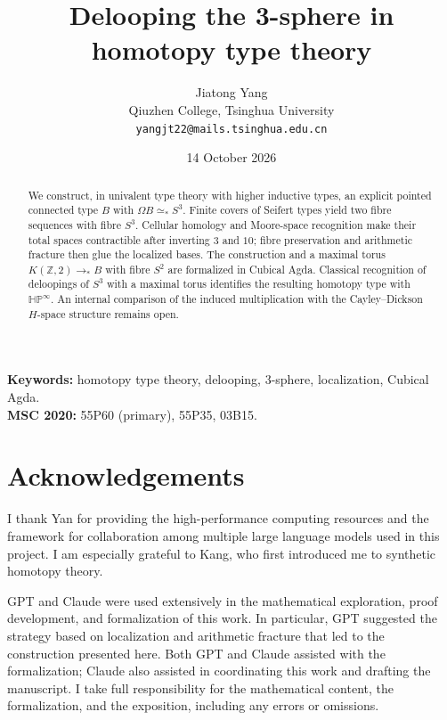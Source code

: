 \documentclass[11pt]{article}
\title{Delooping the 3-sphere in homotopy type theory}
\author{Jiatong Yang\\[2pt]\small Qiuzhen College, Tsinghua University\\\small\texttt{yangjt22@mails.tsinghua.edu.cn}}
\date{14 October 2026}
\theoremstyle{definition}
\theoremstyle{remark}
\newcommand{\eqp}{\simeq_*}
\begin{document}
\maketitle
\begin{abstract}
We construct, in univalent type theory with higher inductive types, an explicit pointed connected type $B$ with $\Omega B\eqp S^3$. Finite covers of Seifert types yield two fibre sequences with fibre $S^3$. Cellular homology and Moore-space recognition make their total spaces contractible after inverting $3$ and $10$; fibre preservation and arithmetic fracture then glue the localized bases. The construction and a maximal torus $K(\mathbb Z,2)\to_*B$ with fibre $S^2$ are formalized in Cubical Agda. Classical recognition of deloopings of $S^3$ with a maximal torus identifies the resulting homotopy type with $\mathbb{HP}^\infty$. An internal comparison of the induced multiplication with the Cayley--Dickson $H$-space structure remains open.
\end{abstract}
\noindent\textbf{Keywords:} homotopy type theory, delooping, 3-sphere, localization, Cubical Agda.\\
\textbf{MSC 2020:} 55P60 (primary), 55P35, 03B15.






\appendix

\section*{Acknowledgements}
I thank Yan for providing the high-performance computing resources and the framework for collaboration among multiple large language models used in this project. I am especially grateful to Kang, who first introduced me to synthetic homotopy theory.

GPT and Claude were used extensively in the mathematical exploration, proof development, and formalization of this work. In particular, GPT suggested the strategy based on localization and arithmetic fracture that led to the construction presented here. Both GPT and Claude assisted with the formalization; Claude also assisted in coordinating this work and drafting the manuscript. I take full responsibility for the mathematical content, the formalization, and the exposition, including any errors or omissions.
\end{document}
